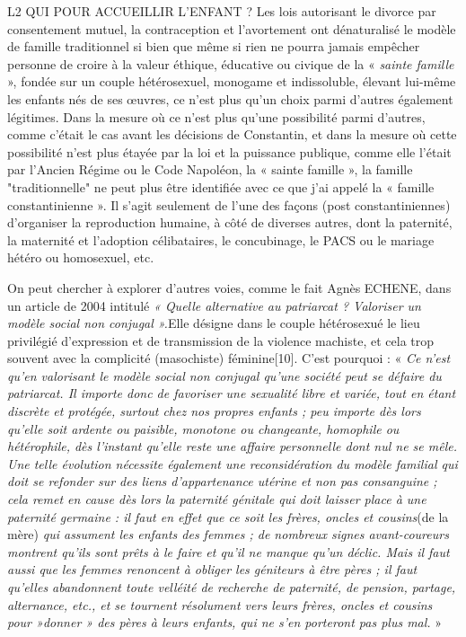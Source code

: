 L2 QUI POUR ACCUEILLIR L'ENFANT ?
 Les lois autorisant le divorce par consentement mutuel, la contraception et l'avortement ont dénaturalisé le modèle de famille traditionnel si bien que même si rien ne pourra jamais empêcher personne de croire à la valeur éthique, éducative ou civique de la « \emph{sainte famille} », fondée sur un couple hétérosexuel, monogame et indissoluble, élevant lui-même les enfants nés de ses œuvres, ce n'est plus qu'un choix parmi d'autres également légitimes. Dans la mesure où ce n'est plus qu'une possibilité parmi d'autres, comme c'était le cas avant les décisions de Constantin, et dans la mesure où cette possibilité n'est plus étayée par la loi et la puissance publique, comme elle l'était par l'Ancien Régime ou le Code Napoléon, la « sainte famille », la famille "traditionnelle" ne peut plus être identifiée avec ce que j'ai appelé la « famille constantinienne ». Il s'agit seulement de l'une des façons (post constantiniennes) d'organiser la reproduction humaine, à côté de diverses autres, dont la paternité, la maternité et l'adoption célibataires, le concubinage, le PACS ou le mariage hétéro ou homosexuel, etc.
 
 On peut chercher à explorer d'autres voies, comme le fait Agnès ECHENE, dans un article de 2004 intitulé \emph{« Quelle alternative au patriarcat ? Valoriser un modèle social non conjugal ».}Elle désigne dans le couple hétérosexué le lieu privilégié d'expression et de transmission de la violence machiste, et cela trop souvent avec la complicité (masochiste) féminine[10]. C'est pourquoi : « \emph{Ce n'est qu'en valorisant le modèle social non conjugal qu'une société peut se défaire du patriarcat. Il importe donc de favoriser une sexualité libre et variée, tout en étant discrète et protégée, surtout chez nos propres enfants ; peu importe dès lors qu'elle soit ardente ou paisible, monotone ou changeante, homophile ou hétérophile, dès l'instant qu'elle reste une affaire personnelle dont nul ne se mêle. Une telle évolution nécessite également une reconsidération du modèle familial qui doit se refonder sur des liens d'appartenance utérine et non pas consanguine ; cela remet en cause dès lors la paternité génitale qui doit laisser place à une paternité germaine : il faut en effet que ce soit les frères, oncles et cousins}(de la mère)\emph{ qui assument les enfants des femmes ; de nombreux signes avant-coureurs montrent qu'ils sont prêts à le faire et qu'il ne manque qu'un déclic. Mais il faut aussi que les femmes renoncent à obliger les géniteurs à être pères ; il faut qu'elles abandonnent toute velléité de recherche de paternité, de pension, partage, alternance, etc., et se tournent résolument vers leurs frères, oncles et cousins pour »donner » des pères à leurs enfants, qui ne s'en porteront pas plus mal.} » 
 
